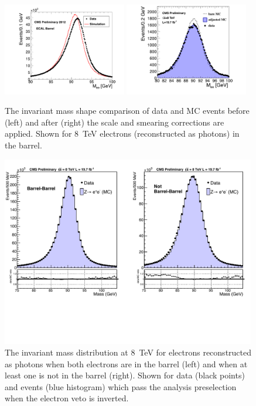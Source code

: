 \begin{figure}
  \includegraphics[width=0.48\textwidth]{analysis_comps/plots/zee_beforecorr_fix.pdf}
  \includegraphics[width=0.48\textwidth]{analysis_comps/plots/zee_aftercorr_fix.pdf}
  \caption[The \Zee invariant mass shape before and after scale and smearing corrections are applied]{The \Zee invariant mass shape comparison of data and MC events before (left) and after (right) the scale and smearing corrections are applied. Shown for 8~TeV electrons (reconstructed as photons) in the barrel.}
  \label{fig:scale_smearing_Zee}
\end{figure}

\begin{figure}
  \includegraphics[width=0.99\textwidth]{analysis_comps/plots/massEBEE_fix.pdf}
  \caption[The \Zee invariant mass distribution at 8~TeV when the electrons are reconstructed as photons]{The \Zee invariant mass distribution at 8~TeV for electrons reconstructed as photons when both electrons are in the barrel (left) and when at least one is not in the barrel (right). Shown for data (black points) and \MC events (blue histogram) which pass the analysis preselection when the electron veto is inverted.}
  \label{fig:scale_smearing_analysis}
\end{figure}

